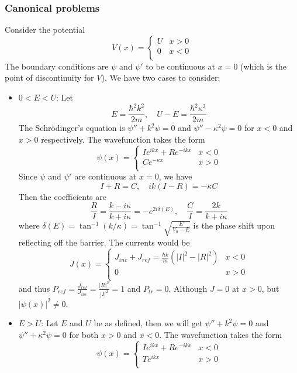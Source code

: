\documentclass[a4paper]{article}
\begin{document}
\subsubsection*{Canonical problems}
\begin{eg}
Consider the potential
   $$
V(x)=
\left\{
        \begin{array}{ll}
      U & x>0\\
	0& x<0\\
        \end{array}
    \right.
$$
The boundary conditions are $\psi$ and $\psi'$ to be continuous at $x=0$ (which is the point of discontinuity for $V$). We have two cases to consider:
\begin{itemize}
    \item $0<E<U$: Let
    $$E=\frac{\hbar^2k^2}{2m},\quad U-E=\frac{\hbar^2\kappa^2}{2m}$$
    The Schr\"{o}dinger's equation is $\psi''+k^2\psi=0$ and $\psi''-\kappa^2\psi=0$ for $x<0$ and $x>0$ respectively. The wavefunction takes the form
       $$
\psi(x)=
\left\{
        \begin{array}{ll}
      Ie^{ikx}+Re^{-ikx} & x<0\\
 Ce^{-\kappa x}& x>0\\
        \end{array}
    \right.
$$
Since $\psi$ and $\psi'$ are continuous at $x=0$, we have
$$I+R=C,\quad ik(I-R)=-\kappa C$$
Then the coefficients are
$$\frac{R}{I}=\frac{k-i\kappa}{k+i\kappa}=-e^{2i\delta(E)},\quad\frac{C}{I}=\frac{2k}{k+i\kappa}$$
where $\delta(E)=\tan^{-1}(k/\kappa)=\tan^{-1}\sqrt{\frac{E}{V_0-E}}$  is the phase shift upon reflecting off the barrier. The currents would be
       $$
J(x)=
\left\{
        \begin{array}{ll}
      J_{inc}+J_{ref}=\frac{\hbar k}{m}(|I|^2-|R|^2)& x<0\\
0& x>0\\
        \end{array}
    \right.
$$
and thus $P_{ref}=\frac{J_{ref}}{J_{inc}}=\frac{|R|^2}{|I|^2}=1$ and $P_{tr}=0$. Although $J=0$ at $x>0$, but $|\psi(x)|^2\neq 0$.
\item $E>U$: Let $E$ and $U$ be as defined, then we will get $\psi''+k^2\psi=0$ and $\psi''+\kappa^2\psi=0$ for both $x>0$ and $x<0$. The wavefunction takes the form
       $$
\psi(x)=
\left\{
        \begin{array}{ll}
      Ie^{ikx}+Re^{-ikx} & x<0\\
 Te^{ikx}& x>0\\
        \end{array}
$$
\end{itemize}
\end{eg}
\end{document}
